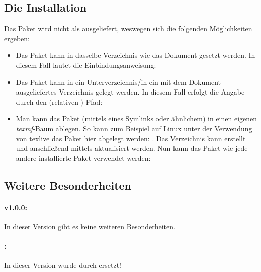 \documentclass{sopra-base}
\begin{document}
\subsection{Die Installation}
    Das Paket wird nicht als  ausgeliefert, weswegen sich die 
    folgenden Möglichkeiten ergeben:
    \begin{itemize}
        \item Das Paket kann in dasselbe Verzeichnis wie das Dokument
                gesetzt werden. In diesem Fall lautet die Einbindungsanweisung:
\begin{plainlatex}
\usepackage{sopra-documentation}
\end{plainlatex}
        \item Das Paket kann in ein Unterverzeichnis/in ein mit
                dem Dokument ausgeliefertes Verzeichnis gelegt werden. In
                diesem Fall erfolgt die Angabe durch den (relativen-) Pfad:
\begin{plainlatex}
\usepackage{./Mein/Pfad/zu/sopra-documentation}
\end{plainlatex}
        \item Man kann das Paket (mittels eines Symlinks oder ähnlichem)
              in einen eigenen \emph{texmf}-Baum ablegen.
              So kann zum Beispiel auf Linux unter der Verwendung von texlive
              das Paket hier abgelegt werden: .
              Das Verzeichnis kann erstellt und anschließend mittels
               aktualisiert werden. Nun kann
              das Paket wie jede andere installierte Paket verwendet werden:
\begin{plainlatex}
\usepackage{sopra-documentation}
\end{plainlatex}
    \end{itemize}
    \subsection{Weitere Besonderheiten}
    \paragraph{v1.0.0:}
    In dieser Version gibt es keine weiteren Besonderheiten.
    \paragraph{\protect\thesodversion:}
    In dieser Version wurde  durch  ersetzt!
\end{document}
